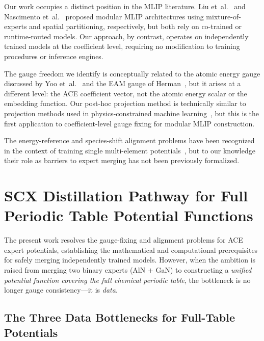 \documentclass[twoside,prb,aps,floatfix,superscriptaddress,longbibliography]{revtex4-2}
\begin{document}
Our work occupies a distinct position in the MLIP literature. Liu et~al.~\cite{Liu2026ScalingMoE} and Nascimento et~al.~\cite{Nascimento2026MoEFramework} proposed modular MLIP architectures using mixture-of-experts and spatial partitioning, respectively, but both rely on co-trained or runtime-routed models. Our approach, by contrast, operates on independently trained models at the coefficient level, requiring no modification to training procedures or inference engines.

The gauge freedom we identify is conceptually related to the atomic energy gauge discussed by Yoo et~al.~\cite{Yoo2019AtomicEnergyMapping} and the EAM gauge of Herman~\cite{Herman2008EAMGauge}, but it arises at a different level: the ACE coefficient vector, not the atomic energy scalar or the embedding function. Our post-hoc projection method is technically similar to projection methods used in physics-constrained machine learning~\cite{PINNProj2024,KKThPINN2024}, but this is the first application to coefficient-level gauge fixing for modular MLIP construction.

The energy-reference and species-shift alignment problems have been recognized in the context of training single multi-element potentials~\cite{Tanaka2023Alignment}, but to our knowledge their role as barriers to expert merging has not been previously formalized.

\section{SCX Distillation Pathway for Full Periodic Table Potential Functions}
\label{sec:scx_distillation}

The present work resolves the gauge-fixing and alignment problems for ACE expert potentials, establishing the mathematical and computational prerequisites for safely merging independently trained models. However, when the ambition is raised from merging two binary experts (AlN $+$ GaN) to constructing a \emph{unified potential function covering the full chemical periodic table}, the bottleneck is no longer gauge consistency---it is \emph{data}.

\subsection{The Three Data Bottlenecks for Full-Table Potentials}
\end{document}
